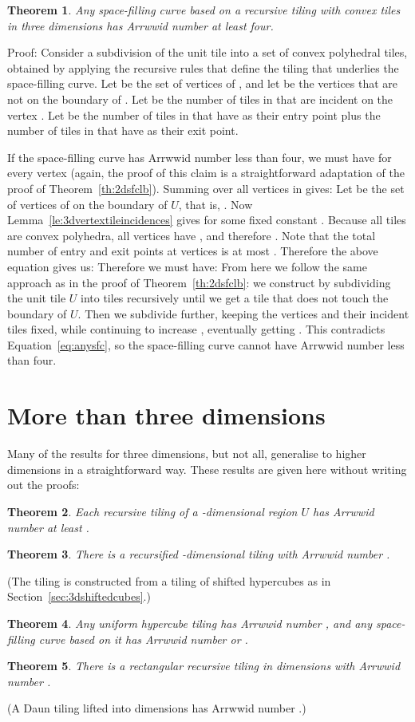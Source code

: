 \documentclass[11pt,a4paper]{article}
\newcommand{\unittile}{\ensuremath{U}\xspace}
\newtheorem{theorem}{Theorem}
\newenvironment{proof}{Proof:}{\qed}
\def\squareforqed{\hbox{\rlap{}}}
\def\qed{\ifmmode\squareforqed\else{\unskip\nobreak\hfil
\penalty50\hskip1em\null\nobreak\hfil\squareforqed
\parfillskip=0pt\finalhyphendemerits=0\endgraf}\fi}
\begin{document}
\begin{theorem}\label{th:3dsfclb}
Any space-filling curve based on a recursive tiling with convex tiles in three dimensions has Arrwwid number at least four.
\end{theorem}
\begin{proof}
Consider a subdivision  of the unit tile  into a set  of convex polyhedral tiles, obtained by applying the recursive rules that define the tiling that underlies the space-filling curve. Let  be the set of vertices of , and let  be the vertices that are not on the boundary of . Let  be the number of tiles in  that are incident on the vertex . Let  be the number of tiles in  that have  as their entry point plus the number of tiles in  that have  as their exit point.

If the space-filling curve has Arrwwid number less than four, we must have  for every vertex  (again, the proof of this claim is a straightforward adaptation of the proof of Theorem~\ref{th:2dsfclb}). Summing over all vertices in  gives:
Let  be the set of vertices of  on the boundary of \unittile, that is, . Now Lemma~\ref{le:3dvertextileincidences} gives  for some fixed constant . Because all tiles are convex polyhedra, all vertices  have , and therefore . Note that the total number of entry and exit points at vertices is at most . Therefore the above equation gives us:
Therefore we must have:
From here we follow the same approach as in the proof of Theorem~\ref{th:2dsfclb}: we construct  by subdividing the unit tile \unittile into tiles recursively until we get a tile  that does not touch the boundary of \unittile. Then we subdivide  further, keeping the vertices  and their incident tiles fixed, while continuing to increase , eventually getting . This contradicts Equation~\ref{eq:anysfc}, so the space-filling curve cannot have Arrwwid number less than four.
\end{proof}

\section{More than three dimensions}
Many of the results for three dimensions, but not all, generalise to higher dimensions in a straightforward way. These results are given here without writing out the proofs:

\begin{theorem}
Each recursive tiling of a -dimensional region \unittile has Arrwwid number at least .
\end{theorem}
\begin{theorem}
There is a recursified -dimensional tiling with Arrwwid number .
\end{theorem}
(The tiling is constructed from a tiling of shifted hypercubes as in Section~\ref{sec:3dshiftedcubes}.)
\begin{theorem}
Any uniform hypercube tiling has Arrwwid number , and any space-filling curve based on it has Arrwwid number  or .
\end{theorem}
\begin{theorem}
There is a rectangular recursive tiling in  dimensions with Arrwwid number .
\end{theorem}
(A Daun tiling lifted into  dimensions has Arrwwid number .)
\end{document}

